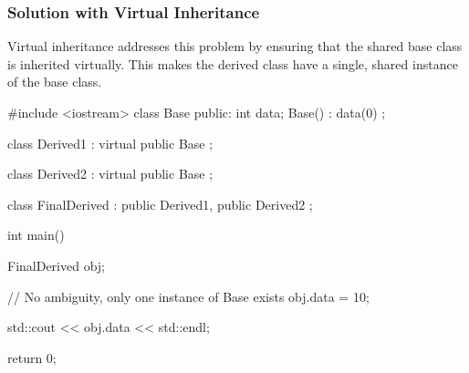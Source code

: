 \documentclass{report}
\begin{document}
    \subsubsection{Solution with Virtual Inheritance}
    \bigbreak \noindent 
    Virtual inheritance addresses this problem by ensuring that the shared base class is inherited virtually. This makes the derived class have a single, shared instance of the base class.
    \bigbreak \noindent 
    \begin{cppcode}
#include <iostream>
class Base {
public:
    int data;
    Base() : data(0) {}
};

class Derived1 : virtual public Base {};

class Derived2 : virtual public Base {};

class FinalDerived : public Derived1, public Derived2 {};

int main() {
    FinalDerived obj;

    // No ambiguity, only one instance of Base exists
    obj.data = 10;

    std::cout << obj.data << std::endl;

    return 0;
}
    \end{cppcode}


    \bigbreak \noindent 
\end{document}
